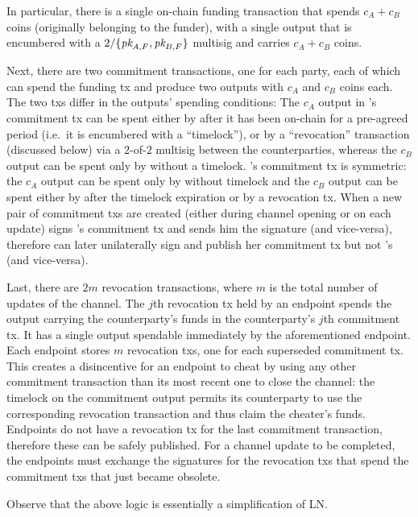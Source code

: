   In particular, there is a single on-chain funding transaction that spends $c_A
  + c_B$ coins (originally belonging to the funder), with a single output that is encumbered with a
  $2/\{\textit{pk}_{A, F}, \textit{pk}_{B, F}\}$ multisig and carries $c_A + c_B$ coins.

  Next, there are two commitment transactions, one for each party, each of which can spend the
  funding tx and produce two outputs with $c_A$ and $c_B$ coins each. The two
  txs differ in the outputs' spending conditions: The $c_A$ output in \alice's
  commitment tx can be spent either by \alice after it has been on-chain for a
  pre-agreed period (i.e.\ it is encumbered with a ``timelock''), or by a
  ``revocation'' transaction (discussed below) via a $2$-of-$2$ multisig between
  the counterparties, whereas the $c_B$ output can be spent only by \bob without
  a timelock. \bob's commitment tx is symmetric: the $c_A$ output can be spent
  only by \alice without timelock and the $c_B$ output can be spent either by
  \bob after the timelock expiration or by a revocation tx. When a new pair of
  commitment txs are created (either during channel opening or on each update)
  \alice signs \bob's commitment tx and sends him the signature (and
  vice-versa), therefore \alice can later unilaterally sign and publish her commitment
  tx but not \bob's (and vice-versa).

  Last, there are $2m$ revocation transactions, where $m$ is the total number of
  updates of the channel. The $j$th revocation tx held by an endpoint spends the
  output carrying the counterparty's funds in the counterparty's $j$th
  commitment tx. It has a single output spendable immediately by the
  aforementioned endpoint. Each endpoint stores $m$ revocation txs, one for each
  superseded commitment tx. This creates a disincentive for an endpoint to cheat
  by using any other commitment transaction than its most recent one to close
  the channel: the timelock on the commitment output permits its counterparty to
  use the corresponding revocation transaction and thus claim the cheater's
  funds.  Endpoints do not have a revocation tx for the last commitment
  transaction, therefore these can be safely published. For a channel update to
  be completed, the endpoints must exchange the signatures for the revocation
  txs that spend the commitment txs that just became obsolete.

  Observe that the above logic is essentially a simplification of LN.

